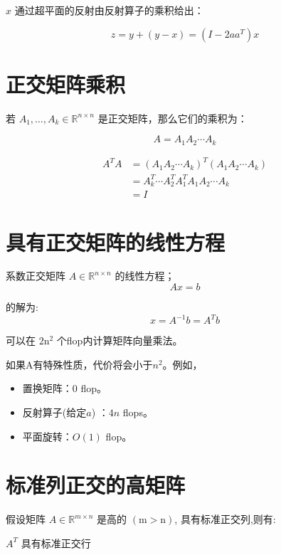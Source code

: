 \begin{corollary}
    $ x $ 通过超平面的反射由反射算子的乘积给出：

    $$ z=y+(y-x)=\left(I-2 a a^{T}\right) x $$
\end{corollary}

\section{正交矩阵乘积}

若 $ A_{1}, \ldots, A_{k} \in \mathbb{R}^{n \times n} $ 是正交矩阵，那么它们的乘积为：

$$ A=A_{1} A_{2} \cdots A_{k} $$

\begin{corollary}[正交矩阵乘积的正交性]

$$\begin{aligned}
    A^{T} A&=\left(A_{1} A_{2} \cdots A_{k}\right)^{T}\left(A_{1} A_{2} \cdots A_{k}\right)\\
    &=A_{k}^{T} \cdots A_{2}^{T} A_{1}^{T} A_{1} A_{2} \cdots A_{k}\\
    &=I
\end{aligned}$$

\end{corollary}


\section{具有正交矩阵的线性方程}

系数正交矩阵 $ A \in \mathbb{R}^{n \times n} $ 的线性方程；
$$
A x=b
$$

的解为:
$$
x=A^{-1} b=A^{T} b
$$

可以在 $ 2 \mathrm{n}^{2} $ 个flop内计算矩阵向量乘法。 

如果A有特殊性质，代价将会小于$n^2$。例如，

\begin{itemize}
    \item 置换矩阵：$0$ flop。
    \item 反射算子(给定$a$) ：$4n$ flops。
    \item 平面旋转：$O(1)$ flop。
\end{itemize}

\section{标准列正交的高矩阵}

\begin{theorem}
    假设矩阵 $ A \in \mathbb{R}^{m \times n} $ 是高的 $ (\mathrm{m}>\mathrm{n}) $, 具有标准正交列,则有:

    $ A^{T} $ 具有标准正交行
\end{theorem}

